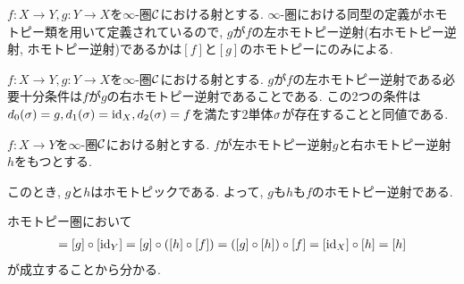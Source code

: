 \documentclass[uplatex, a4paper, 14Q, dvipdfmx]{jsreport}
\begin{document}
\begin{remark}
  $f: X \to Y, g: Y \to X$を$\infty$-圏$\mathcal{C}$における射とする. 
  $\infty$-圏における同型の定義がホモトピー類を用いて定義されているので, $g$が$f$の左ホモトピー逆射(右ホモトピー逆射, ホモトピー逆射)であるかは$[f]$と$[g]$のホモトピーにのみによる. 
\end{remark}

\begin{remark}
  $f: X \to Y, g: Y \to X$を$\infty$-圏$\mathcal{C}$における射とする. 
  $g$が$f$の左ホモトピー逆射である必要十分条件は$f$が$g$の右ホモトピー逆射であることである. 
  この2つの条件は$d_0(\sigma)=g, d_1(\sigma)=\mathrm{id}_X, d_2(\sigma)=f$を満たす$2$単体$\sigma$が存在することと同値である. 
  \begin{center}
  \end{center}
\end{remark}

\begin{remark}
  $f: X \to Y$を$\infty$-圏$\mathcal{C}$における射とする. 
  $f$が左ホモトピー逆射$g$と右ホモトピー逆射$h$をもつとする. 
  \begin{center}
  \end{center}
  このとき, $g$と$h$はホモトピックである. 
  よって, $g$も$h$も$f$のホモトピー逆射である. 
\end{remark}

\begin{Proof}
  ホモトピー圏において
  \begin{align*}
    [g]=[g] \ci [\id_Y] = [g] \ci ([h] \ci [f]) = ([g] \ci [h]) \ci [f]
    =[\id_X] \ci [h] =[h]
  \end{align*}
  が成立することから分かる. 
\end{Proof}
\end{document}

